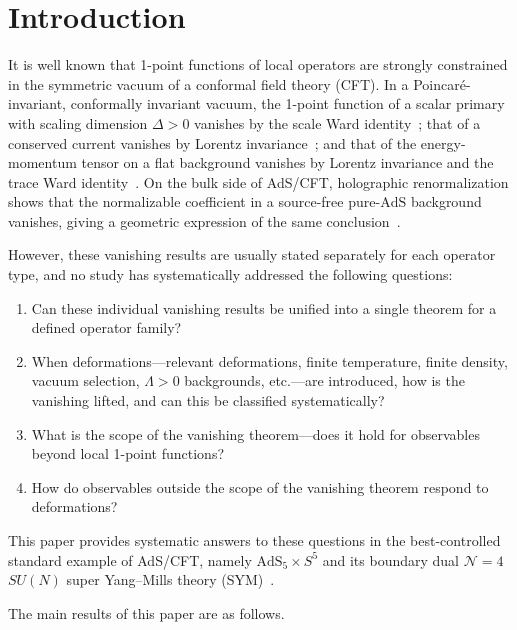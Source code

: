 \documentclass[
  aps,
  prd,
  preprint,
  groupedaddress,
  nofootinbib,
  longbibliography
]{revtex4-2}
\theoremstyle{remark}
\newcommand{\N}{\mathcal{N}}
\newcommand{\AdS}{\mathrm{AdS}}
\begin{document}
\section{Introduction}\label{sec:intro}

It is well known that 1-point functions of local operators
are strongly constrained in the symmetric vacuum of a conformal field
theory (CFT).
In a Poincar\'e-invariant, conformally invariant vacuum,
the 1-point function of a scalar primary with scaling dimension
$\Delta>0$ vanishes by the scale Ward identity~\cite{ref13,ref14};
that of a conserved current vanishes by Lorentz
invariance~\cite{ref13,ref14};
and that of the energy-momentum tensor on a flat background
vanishes by Lorentz invariance and the trace Ward
identity~\cite{ref5,ref13,ref14}.
On the bulk side of AdS/CFT, holographic renormalization shows
that the normalizable coefficient in a source-free pure-$\AdS$
background vanishes, giving a geometric expression of the same
conclusion~\cite{ref9,ref10,ref11,ref12}.

However, these vanishing results are usually stated separately
for each operator type, and no study has systematically addressed
the following questions:

\begin{enumerate}
\item[(i)]
Can these individual vanishing results be unified into a single
theorem for a defined operator family?

\item[(ii)]
When deformations---relevant deformations, finite temperature,
finite density, vacuum selection, $\Lambda>0$ backgrounds,
etc.---are introduced, how is the vanishing lifted, and can
this be classified systematically?

\item[(iii)]
What is the scope of the vanishing theorem---does it hold for
observables beyond local 1-point functions?

\item[(iv)]
How do observables outside the scope of the vanishing theorem
respond to deformations?
\end{enumerate}

This paper provides systematic answers to these questions
in the best-controlled standard example of AdS/CFT,
namely $\AdS_5\times S^5$ and its boundary dual $\N=4$
$SU(N)$ super Yang--Mills theory (SYM)~\cite{ref1,ref2,ref3,ref4}.

\bigskip

The main results of this paper are as follows.
\end{document}
